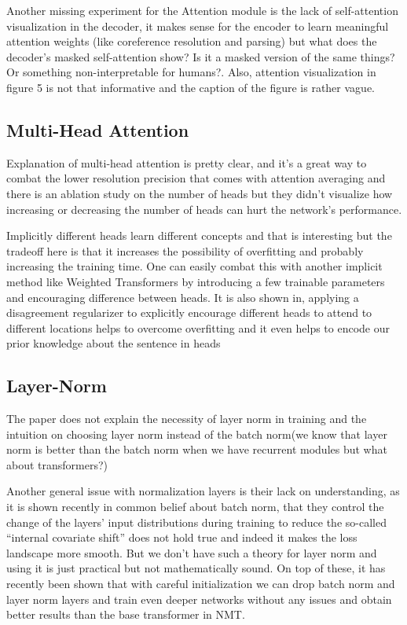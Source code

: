 \documentclass{article}
\begin{document}
Another missing experiment for the Attention module is the lack of self-attention visualization in the decoder, it makes sense for the encoder to learn meaningful attention weights (like coreference resolution and parsing) but what does the decoder’s masked self-attention show? Is it a masked version of the same things? Or something non-interpretable for humans?. Also, attention visualization in figure 5 is not that informative and the caption of the figure is rather vague.

\subsection{Multi-Head Attention}
Explanation of multi-head attention is pretty clear, and it’s a great way to combat the lower resolution precision that comes with attention averaging and there is an ablation study on the number of heads but they didn’t visualize how increasing or decreasing the number of heads can hurt the network’s performance.

Implicitly different heads learn different concepts and that is interesting but the tradeoff here is that it increases the possibility of overfitting and probably increasing the training time. One can easily combat this with another implicit method like Weighted Transformers\citep{1711.02132} by introducing a few trainable parameters and encouraging difference between heads. It is also shown in\citep{1810.10183}, applying a disagreement regularizer to explicitly encourage different heads to attend to different locations helps to overcome overfitting and it even helps to encode our prior knowledge about the sentence in heads\citep{1804.08199}

\subsection{Layer-Norm}
The paper does not explain the necessity of layer norm in training and the intuition on choosing layer norm instead of the batch norm(we know that layer norm is better than the batch norm when we have recurrent modules but what about transformers?)

Another general issue with normalization layers is their lack on understanding, as it is shown recently in\citep{1805.11604} common belief about batch norm, that they control the change of the layers’ input distributions during training to reduce the so-called “internal covariate shift” does not hold true and indeed it makes the loss landscape more smooth. But we don’t have such a theory for layer norm and using it is just practical but not mathematically sound. On top of these, it has recently been shown\citep{1901.09321} that with careful initialization we can drop batch norm and layer norm layers and train even deeper networks without any issues and obtain better results than the base transformer in NMT.
\end{document}
